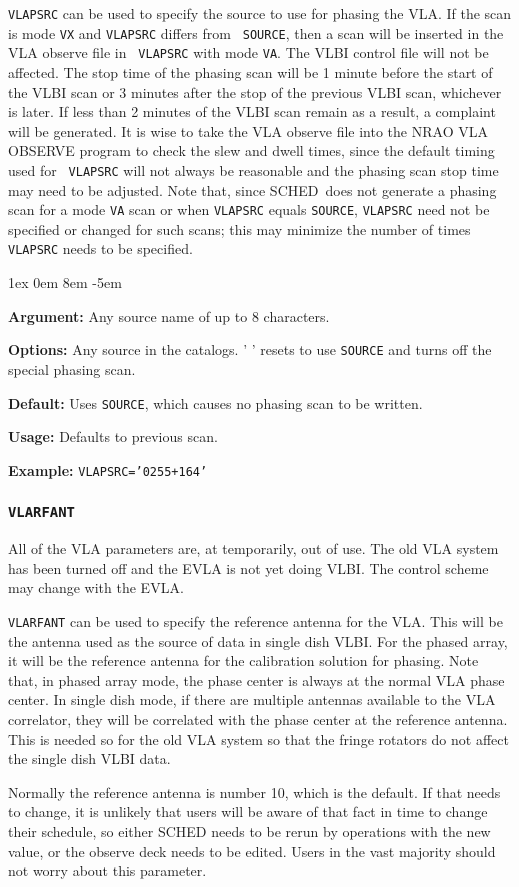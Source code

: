 \documentclass{report}
\newcommand{\schedb}{{\sc SCHED~}}
\newcommand{\rcwbox}[5]{
  \begin{list}{}{\parsep 1ex  \itemsep 0em
                 \leftmargin 8em  \itemindent -5em }
    \item {\bf Argument:} #1
    \item {\bf Options:}  #2
    \item {\bf Default:}  #3
    \item {\bf Usage:}    #4
    \item {\bf Example:}  #5
  \end{list}
}
\begin{document}
{\tt VLAPSRC} can be used to specify the source to use for phasing the
VLA. If the scan is mode {\tt VX} and {\tt VLAPSRC} differs from {\tt
SOURCE}, then a scan will be inserted in the VLA observe file in {\tt
VLAPSRC} with mode {\tt VA}. The VLBI control file will not be
affected. The stop time of the phasing scan will be 1 minute before
the start of the VLBI scan or 3 minutes after the stop of the previous
VLBI scan, whichever is later. If less than 2 minutes of the VLBI scan
remain as a result, a complaint will be generated. It is wise to take
the VLA observe file into the NRAO {\sc VLA OBSERVE} program to check
the slew and dwell times, since the default timing used for {\tt
VLAPSRC} will not always be reasonable and the phasing scan stop time
may need to be adjusted. Note that, since \schedb does not
generate a phasing scan for a mode {\tt VA} scan or when {\tt VLAPSRC}
equals {\tt SOURCE}, {\tt VLAPSRC} need not be specified or changed
for such scans; this may minimize the number of times {\tt VLAPSRC}
needs to be specified.

\rcwbox
{Any source name of up to 8 characters.}
{Any source in the catalogs. ' ' resets to use {\tt SOURCE} and
turns off the special phasing scan.}
{Uses {\tt SOURCE}, which causes no phasing scan to be written.}
{Defaults to previous scan.}
{{\tt VLAPSRC='0255+164'}}


\subsubsection{\label{MP:VLARFANT}{\tt VLARFANT}}

All of the VLA parameters are, at temporarily, out of use.  The old
VLA system has been turned off and the EVLA is not yet doing VLBI.
The control scheme may change with the EVLA.

{\tt VLARFANT} can be used to specify the reference antenna for the
VLA.  This will be the antenna used as the source of data in single
dish VLBI.  For the phased array, it will be the reference antenna
for the calibration solution for phasing.  Note that, in phased array
mode, the phase center is always at the normal VLA phase center.  In
single dish mode, if there are multiple antennas available to the
VLA correlator, they will be correlated with the phase center at the
reference antenna.  This is needed so for the old VLA system so that
the fringe rotators do not affect the single dish VLBI data.

Normally the reference antenna is number 10, which is the default.
If that needs to change, it is unlikely that users will be aware of
that fact in time to change their schedule, so either SCHED needs to
be rerun by operations with the new value, or the observe deck needs
to be edited.  Users in the vast majority should not worry about this
parameter.
\end{document}
